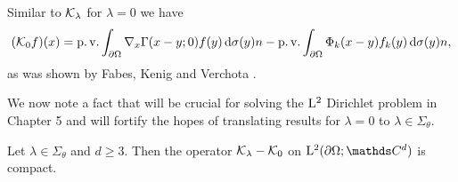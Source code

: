 Similar to $\mathcal{K}_\lambda$ for $\lambda = 0$ we have
\begin{align}
  \label{eq:defnK0}
    (\mathcal{K}_0 f)(x)= \operatorname{p. v.} \int_{\partial\Omega} \nabla_x \Gamma(x - y; 0)  f(y) \, {\operatorname{d}\!{\sigma}}(y) n - \operatorname{p. v.} \int_{\partial\Omega} \Phi_k(x - y) f_k(y) \, {\operatorname{d}\!{\sigma}}(y) n,
\end{align}
as was shown by Fabes, Kenig and Verchota \cite[(0.12)]{fabesKenigVerchota}.

We now note a fact that will be crucial for solving the $\mathrm{L}^2$ Dirichlet problem in Chapter 5 and will fortify the hopes of translating results for $\lambda = 0$ to $\lambda \in \Sigma_\theta$.
\begin{lem}
  \label{lem:compactness}
  Let $\lambda \in \Sigma_\theta$ and $d \geq 3$.
  Then the operator $\mathcal{K}_\lambda - \mathcal{K}_0$ on $\Ell^2(\partial\Omega; \C^d)$ is compact.
\end{lem}

